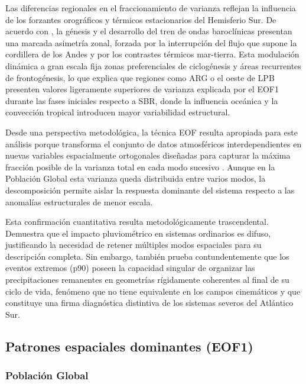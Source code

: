 Las diferencias regionales en el fraccionamiento de varianza reflejan la influencia de los forzantes orográficos y térmicos estacionarios del Hemisferio Sur. De acuerdo con \citet{inatsu2004zonal}, la génesis y el desarrollo del tren de ondas baroclínicas presentan una marcada asimetría zonal, forzada por la interrupción del flujo que supone la cordillera de los Andes y por los contrastes térmicos mar-tierra. Esta modulación dinámica a gran escala fija zonas preferenciales de ciclogénesis y áreas recurrentes de frontogénesis, lo que explica que regiones como ARG o el oeste de LPB presenten valores ligeramente superiores de varianza explicada por el EOF1 durante las fases iniciales respecto a SBR, donde la influencia oceánica y la convección tropical introducen mayor variabilidad estructural.

Desde una perspectiva metodológica, la técnica EOF resulta apropiada para este análisis porque transforma el conjunto de datos atmosféricos interdependientes en nuevas variables espacialmente ortogonales diseñadas para capturar la máxima fracción posible de la varianza total en cada modo sucesivo \citep{wilks2019statistical_ch13}. Aunque en la Población Global esta varianza queda distribuida entre varios modos, la descomposición permite aislar la respuesta dominante del sistema respecto a las anomalías estructurales de menor escala. 

Esta confirmación cuantitativa resulta metodológicamente trascendental. Demuestra que el impacto pluviométrico en sistemas ordinarios es difuso, justificando la necesidad de retener múltiples modos espaciales para su descripción completa. Sin embargo, también prueba contundentemente que los eventos extremos (p90) poseen la capacidad singular de organizar las precipitaciones remanentes en geometrías rígidamente coherentes al final de su ciclo de vida, fenómeno que no tiene equivalente en los campos cinemáticos y que constituye una firma diagnóstica distintiva de los sistemas severos del Atlántico Sur.
\subsection{Patrones espaciales dominantes (EOF1)}\label{subsec:eof1_tp}

% 
\subsubsection{Población Global}\label{subsubsec:eof1_tp_global}

